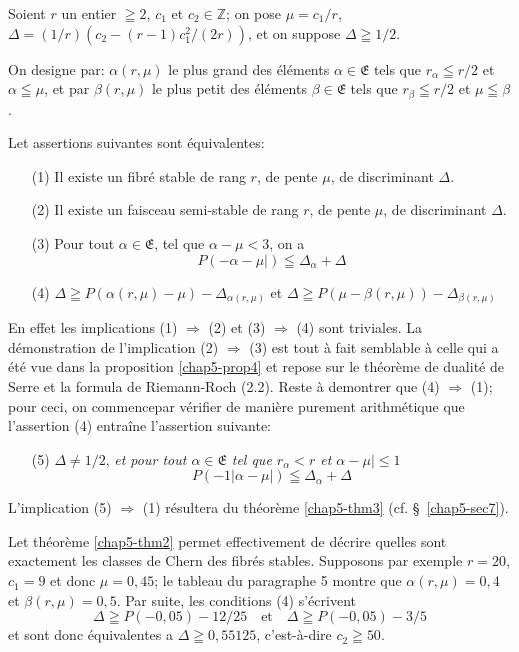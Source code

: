 \begin{theorem}\label{chap5-thm2}
Soient $r$ un entier $\geqq 2$, $c_{1}$ et $c_{2}\in \mathbb{Z}$; on
pose $\mu=c_{1}/r$, $\Delta=(1/r)(c_{2}-(r-1)c^{2}_{1}/(2r))$, et on
suppose $\Delta\geqq 1/2$. 

On designe par: $\alpha(r,\mu)$ le plus grand des \'el\'ements
$\alpha\in \mathfrak{E}$ tels que $r_{\alpha}\leqq r/2$ et
$\alpha\leqq \mu$, et par $\beta(r,\mu)$ le plus petit
des \'el\'ements $\beta\in \mathfrak{E}$ tels que $r_{\beta}\leqq r/2$
et $\mu\leqq \beta$.

Let assertions suivantes sont \'equivalentes:
\begin{itemize}
\item[\rm(1)] Il existe un fibr\'e stable de rang $r$, de pente $\mu$,
de discriminant $\Delta$.

\item[\rm(2)] Il existe un faisceau semi-stable de rang $r$, de pente
$\mu$, de discriminant $\Delta$.

\item[\rm(3)] Pour tout $\alpha\in \mathfrak{E}$, tel que
$\alpha-\mu<3$, on a
$$
P(-\alpha-\mu|)\leqq \Delta_{\alpha}+\Delta
$$

\item[\rm(4)] $\Delta\geqq
P(\alpha(r,\mu)-\mu)-\Delta_{\alpha(r,\mu)}$ et $\Delta\geqq
P(\mu-\beta(r,\mu))-\Delta_{\beta(r,\mu)}$ 
\end{itemize}
\end{theorem}
En effet les implications (1) $\Rightarrow$ (2) et (3) $\Rightarrow$
(4) sont triviales. La d\'emonstration de l'implication (2)
$\Rightarrow$ (3) est tout \`a fait semblable \`a celle qui a \'et\'e
vue dans la proposition \ref{chap5-prop4} et repose sur le
th\'eor\`eme de dualit\'e de Serre et la formula de Riemann-Roch
(2.2). Reste \`a demontrer que (4) $\Rightarrow$ (1); pour ceci, on
commence\pageoriginale par v\'erifier de mani\`ere purement
arithm\'etique que l'assertion (4) entra\^ine l'assertion suivante:
\begin{itemize}
\item[(5)] $\Delta\neq 1/2$, {\em et pour tout
$\alpha\in \mathfrak{E}$ tel que $r_{\alpha}<r$ et $\alpha-\mu|\leq 1$}
$$
P(-1|\alpha-\mu|)\leqq \Delta_{\alpha}+\Delta
$$
\end{itemize}

L'implication (5) $\Rightarrow$ (1) r\'esultera du th\'eor\`eme \ref{chap5-thm3}
(cf. \S\ \ref{chap5-sec7}). 

Let th\'eor\`eme \ref{chap5-thm2} permet effectivement de d\'ecrire
quelles sont exactement les classes de Chern des fibr\'es
stables. Supposons par exemple $r=20$, $c_{1}=9$ et donc $\mu=0,45$;
le tableau du paragraphe 5 montre que $\alpha(r,\mu)=0,4$ et
$\beta(r,\mu)=0,5$. Par suite, les conditions (4) s'\'ecrivent 
$$
\Delta\geqq P(-0,05)-12/25\quad\text{et}\quad \Delta\geqq P(-0,05)-3/5
$$
et sont donc \'equivalentes a $\Delta\geqq 0,55125$, c'est-\`a-dire
$c_{2}\geqq 50$.

